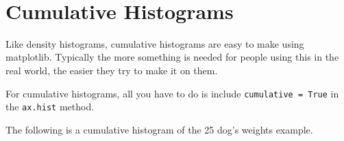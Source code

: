 \documentclass[11pt]{article}
\begin{document}
    \begin{center}
    \end{center}
    { \hspace*{\fill} \\}
    
    \hypertarget{cumulative-histograms}{%
\section{Cumulative Histograms}\label{cumulative-histograms}}

    Like density histograms, cumulative histograms are easy to make using
matplotlib. Typically the more something is needed for people using this
in the real world, the easier they try to make it on them.

For cumulative histograms, all you have to do is include
\texttt{cumulative\ =\ True} in the \texttt{ax.hist} method.

The following is a cumulative histogram of the 25 dog's weights example.
\end{document}
